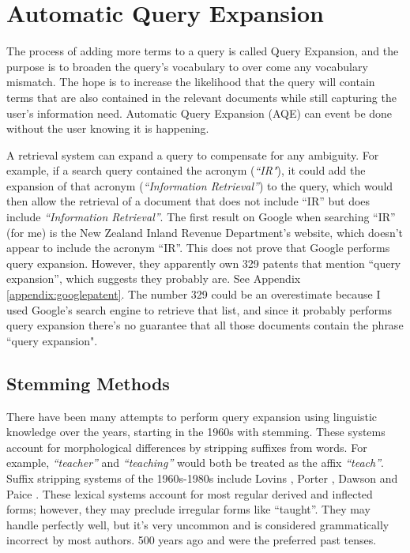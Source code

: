 

\section{Automatic Query Expansion}
The process of adding more terms to a query is called Query Expansion, and the purpose is to broaden the query's vocabulary to over come any vocabulary mismatch. The hope is to increase the likelihood that the query will contain terms that are also contained in the relevant documents while still capturing the user's information need. Automatic Query Expansion (AQE) can event be done without the user knowing it is happening.

A retrieval system can expand a query to compensate for any ambiguity. For example, if a search query contained the acronym (\textit{``IR"}), it could add the expansion of that acronym (\textit{``Information Retrieval''}) to the query, which would then allow the retrieval of a document that does not include  ``IR'' but does include \textit{``Information Retrieval''}. The first result on Google when searching ``IR'' (for me) is the New Zealand Inland Revenue Department's website, which doesn't appear to include the acronym ``IR''. This does not prove that Google performs query expansion. However, they apparently own 329 patents that mention ``query expansion'', which suggests they probably are. See Appendix \ref{appendix:googlepatent}. The number 329 could be an overestimate because I used Google's search engine to retrieve that list, and since it probably performs query expansion there's no guarantee that all those documents contain the phrase ``query expansion".

\subsection{Stemming Methods}
There have been many attempts to perform query expansion using linguistic knowledge over the years, starting in the 1960s with stemming. These systems account for morphological differences by stripping suffixes from words. For example, \textit{``teacher''} and  \textit{``teaching''} would both be treated as the affix \textit{``teach''}. Suffix stripping systems of the 1960s-1980s include Lovins \cite{lovins1968development}, Porter \cite{porter1980algorithm}, Dawson \cite{dawson1974suffix} and Paice \cite{paice1990another}. These lexical systems account for most regular derived and inflected forms; however, they may preclude irregular forms like ``taught''. They may handle perfectly well, but it's very uncommon and is considered grammatically incorrect by most authors. 500 years ago and  were the preferred past tenses.

